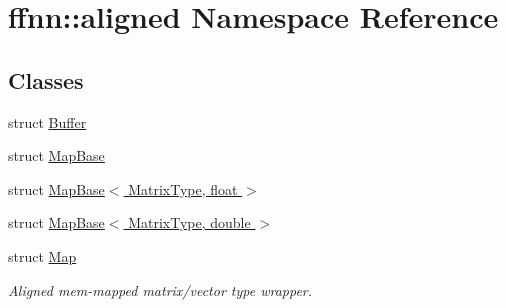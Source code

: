 \hypertarget{namespaceffnn_1_1aligned}{\section{ffnn\-:\-:aligned Namespace Reference}
\label{namespaceffnn_1_1aligned}
}
\subsection*{Classes}
\begin{DoxyCompactItemize}
\item 
struct \hyperlink{structffnn_1_1aligned_1_1_buffer}{Buffer}
\item 
struct \hyperlink{structffnn_1_1aligned_1_1_map_base}{Map\-Base}
\item 
struct \hyperlink{structffnn_1_1aligned_1_1_map_base_3_01_matrix_type_00_01float_01_4}{Map\-Base$<$ Matrix\-Type, float $>$}
\item 
struct \hyperlink{structffnn_1_1aligned_1_1_map_base_3_01_matrix_type_00_01double_01_4}{Map\-Base$<$ Matrix\-Type, double $>$}
\item 
struct \hyperlink{structffnn_1_1aligned_1_1_map}{Map}
\begin{DoxyCompactList}\small\item\em Aligned mem-\/mapped matrix/vector type wrapper. \end{DoxyCompactList}\end{DoxyCompactItemize}
